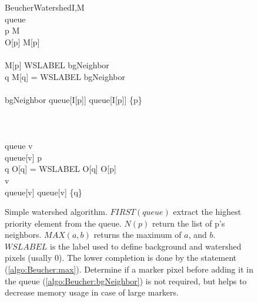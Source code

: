 \documentclass{InsightArticle}
\begin{document}
\begin{figure}[htbp]
\centering
\small
\begin{pseudocode}[framebox]{BeucherWatershed}{I,M}
 \\
queue \GETS \emptyset \\
\FOREACH p \in M \DO
\BEGIN
  \\
  O[p] \GETS M[p] \\
  \\
  \IF M[p] \neq WSLABEL
  \THEN
  \BEGIN
    bgNeighbor \GETS \FALSE \\
    \FOREACH q \in {} \DO 
    \BEGIN
      \IF M[q] = WSLABEL
        \THEN bgNeighbor \GETS \TRUE \\
    \END\\
    \IF bgNeighbor 
      \THEN
      queue[I[p]] \GETS queue[I[p]] \cup \{p\} \\
  \END
\END
\\
\\
 \\
\WHILE queue \neq \emptyset \DO
\BEGIN
  v \GETS {}\\
  \WHILE queue[v] \neq \emptyset \DO
  \BEGIN
    p \GETS {} \\
    \FOREACH q \in {} \DO
    \BEGIN
    \IF O[q] = WSLABEL
    \THEN
    \BEGIN
      O[q] \GETS O[p] \\
      v \GETS {}  \\
      queue[v] \GETS queue[v] \cup \{q\} \\
    \END
    \END
  \END
\END
\end{pseudocode}
\caption{Simple watershed algorithm.\label{BeucherAlgorithm} $FIRST(queue)$ extract the highest priority element from the queue. $N(p)$ return the list of p's neighbors. $MAX(a,b)$ returns the maximum of $a$, and $b$. $WSLABEL$ is the label used to define background and watershed pixels (usally $0$). The lower completion is done by the statement (\ref{algo:Beucher:max}). Determine if a marker pixel before adding it in the queue (\ref{algo:Beucher:bgNeighbor}) is not required, but helps to decrease memory usage in case of large markers.}
\end{figure}
\end{document}
